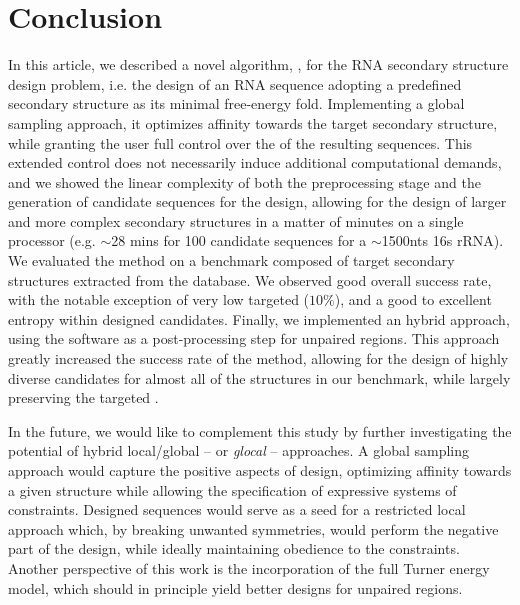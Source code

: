 \section{Conclusion}

\label{sec:conclusion}

In this article, we described a novel algorithm, \ourprog, for the RNA secondary structure design problem, i.e. the design of an RNA sequence adopting a predefined secondary structure as its minimal free-energy fold. Implementing a global sampling approach, it optimizes affinity towards the target secondary structure, while granting the user full control over the \GCContent of the resulting sequences.
This extended control does not necessarily induce additional computational demands, and we showed the linear complexity of both the preprocessing stage and the generation of candidate sequences for the design, allowing for the design of larger and more complex secondary structures in a matter of minutes on a single processor (e.g. $\sim$28 mins for 100 candidate sequences for a $\sim$1500nts 16s rRNA). We evaluated the method on a benchmark composed of target secondary structures extracted from the \RNASTRAND database. We observed good overall success rate, with the notable exception of very low targeted \GCContent ($10\%$), and a good to excellent entropy within designed candidates.
Finally, we implemented an hybrid approach, using the \RNAinverse software as a post-processing step for unpaired regions. This approach greatly increased the success rate of the method, allowing for the design of highly diverse candidates for almost all of the structures in our benchmark, while largely preserving the targeted \GCContent.

In the future, we would like to complement this study by further investigating the potential of hybrid local/global -- or {\em glocal} -- approaches. A global sampling approach would capture the positive aspects of design, optimizing affinity towards a given structure while allowing the specification of expressive systems of constraints. Designed sequences would serve as a seed for a restricted local approach which, by breaking unwanted symmetries, would perform the negative part of the design, while ideally maintaining obedience to the constraints. Another perspective of this work is the incorporation of the full Turner energy model, which should in principle yield better designs for unpaired regions.